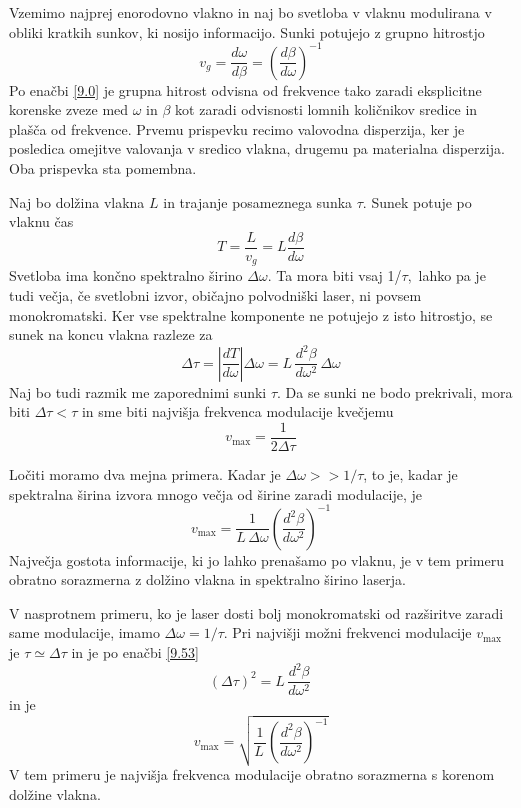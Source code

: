 Vzemimo najprej enorodovno vlakno in naj bo svetloba v vlaknu modulirana
v obliki kratkih sunkov, ki nosijo informacijo. Sunki potujejo z grupno
hitrostjo 
\begin{equation}
v_{g}=\frac{d\omega}{d\beta}=\left(\frac{d\beta}{d\omega}\right)^{-1}\label{9.51}
\end{equation}
 Po enačbi \ref{9.0} je grupna hitrost odvisna od frekvence tako
zaradi eksplicitne korenske zveze med $\omega$ in $\beta$ kot zaradi
odvisnosti lomnih količnikov sredice in plašča od frekvence. Prvemu
prispevku recimo valovodna disperzija, ker je posledica omejitve valovanja
v sredico vlakna, drugemu pa materialna disperzija. Oba prispevka
sta pomembna.

Naj bo dolžina vlakna $L$ in trajanje posameznega sunka $\tau$.
Sunek potuje po vlaknu čas 
\begin{equation}
T=\frac{L}{v_{g}}=L\frac{d\beta}{d\omega}\label{9.52}
\end{equation}
 Svetloba ima končno spektralno širino $\Delta\omega$. Ta mora biti
vsaj 1/$\tau,$ lahko pa je tudi večja, če svetlobni izvor, običajno
polvodniški laser, ni povsem monokromatski. Ker vse spektralne komponente
ne potujejo z isto hitrostjo, se sunek na koncu vlakna razleze za
\begin{equation}
\Delta\tau=\left|\frac{dT}{d\omega}\right|\Delta\omega=L\,\frac{d^{2}\beta}{d\omega^{2}}\,\Delta\omega\label{9.53}
\end{equation}
 Naj bo tudi razmik me zaporednimi sunki $\tau.$ Da se sunki ne bodo
prekrivali, mora biti $\Delta\tau<\tau$ in sme biti najvišja frekvenca
modulacije kvečjemu 
\begin{equation}
v_{\max}=\frac{1}{2\Delta\tau}\label{9.54}
\end{equation}


Ločiti moramo dva mejna primera. Kadar je $\Delta\omega>>1/\tau$,
to je, kadar je spektralna širina izvora mnogo večja od širine zaradi
modulacije, je 
\begin{equation}
v_{\max}=\frac{1}{L\,\Delta\omega}\left(\frac{d^{2}\beta}{d\omega^{2}}\right)^{-1}\label{9.55}
\end{equation}
 Največja gostota informacije, ki jo lahko prenašamo po vlaknu, je
v tem primeru obratno sorazmerna z dolžino vlakna in spektralno širino
laserja.

V nasprotnem primeru, ko je laser dosti bolj monokromatski od razširitve
zaradi same modulacije, imamo $\Delta\omega=1/\tau$. Pri najvišji
možni frekvenci modulacije $v_{\max}$ je $\tau\simeq\Delta\tau$
in je po enačbi \ref{9.53} 
\begin{equation}
(\Delta\tau)^{2}=L\,\frac{d^{2}\beta}{d\omega^{2}}\,\label{9.56}
\end{equation}
 in je 
\begin{equation}
v_{\max}=\sqrt{\frac{1}{L\,}\left(\frac{d^{2}\beta}{d\omega^{2}}\right)^{-1}}\label{9.57}
\end{equation}
 V tem primeru je najvišja frekvenca modulacije obratno sorazmerna
s korenom dolžine vlakna.

